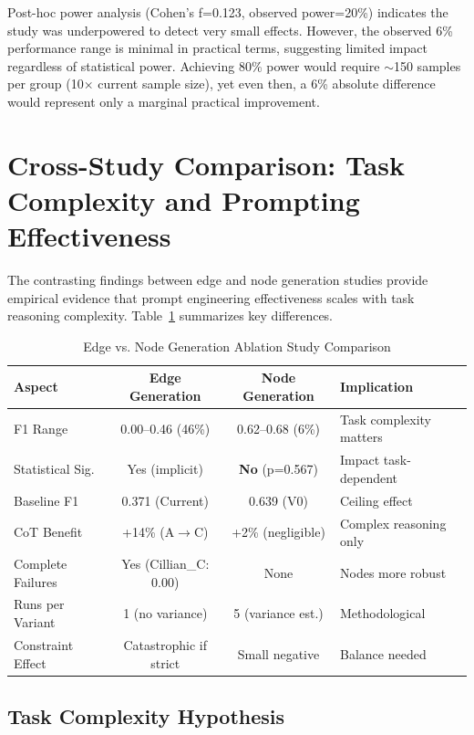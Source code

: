 Post-hoc power analysis (Cohen's f=0.123, observed power=20\%) indicates the study was underpowered to detect very small effects. However, the observed 6\% performance range is minimal in practical terms, suggesting limited impact regardless of statistical power. Achieving 80\% power would require $\sim$150 samples per group (10$\times$ current sample size), yet even then, a 6\% absolute difference would represent only a marginal practical improvement.

\section{Cross-Study Comparison: Task Complexity and Prompting Effectiveness}
\label{sec:comparison}

The contrasting findings between edge and node generation studies provide empirical evidence that prompt engineering effectiveness scales with task reasoning complexity. Table~\ref{tab:edge_node_comparison} summarizes key differences.

\begin{table}[htbp]
\centering
\caption{Edge vs. Node Generation Ablation Study Comparison}
\label{tab:edge_node_comparison}
\small
\begin{tabular}{@{}lccl@{}}
\toprule
\textbf{Aspect} & \textbf{Edge Generation} & \textbf{Node Generation} & \textbf{Implication} \\
\midrule
F1 Range & 0.00--0.46 (46\%) & 0.62--0.68 (6\%) & Task complexity matters \\
Statistical Sig. & Yes (implicit) & \textbf{No} (p=0.567) & Impact task-dependent \\
Baseline F1 & 0.371 (Current) & 0.639 (V0) & Ceiling effect \\
CoT Benefit & +14\% (A$\to$C) & +2\% (negligible) & Complex reasoning only \\
Complete Failures & Yes (Cillian\_C: 0.00) & None & Nodes more robust \\
Runs per Variant & 1 (no variance) & 5 (variance est.) & Methodological \\
Constraint Effect & Catastrophic if strict & Small negative & Balance needed \\
\bottomrule
\end{tabular}
\end{table}

\subsection{Task Complexity Hypothesis}

